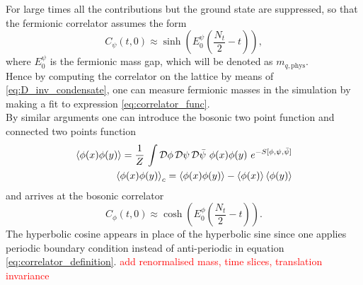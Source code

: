 For large times all the contributions but the ground state are suppressed, so that 
the fermionic correlator assumes the form 
\begin{equation}
    C_\psi(t,0) \approx \sinh \left(E_0^{\psi} \left(\frac{N_t}{2} - t\right)\right),
    \label{eq:correlator_func}
\end{equation}
where $E_0^{\psi}$ is the fermionic mass gap, which will be denoted as $m_{q,\text{phys}}$. \\
Hence by computing the correlator on the lattice by means of \eqref{eq:D_inv_condensate}, one can measure fermionic masses in the simulation by making a fit to expression \eqref{eq:correlator_func}. \\
By similar arguments one can introduce the bosonic two point function and connected two points function 
\begin{equation*}
    \begin{aligned}
        \left\langle \phi(x)\phi(y) \right\rangle = \frac{1}{Z} \, \int \mathcal{D}\phi \, \mathcal{D}\psi \, \mathcal{D}\bar\psi \ \phi(x) \phi(y) \ e^{-S[\phi, \psi, \bar\psi]} \\
        \left\langle \phi(x)\phi(y) \right\rangle_c = \left\langle \phi(x)\phi(y) \right\rangle - \left\langle \phi(x) \right\rangle\left\langle \phi(y) \right\rangle
    \end{aligned}
\end{equation*}
and arrives at the bosonic correlator 
\begin{equation}
    C_\phi(t,0) \approx \cosh \left(E_0^{\phi} \left(\frac{N_t}{2} - t\right)\right).
    \label{eq:correlator_func}
\end{equation}
The hyperbolic cosine appears in place of the hyperbolic sine since one applies periodic boundary condition instead of anti-periodic in equation \eqref{eq:correlator_definition}.
\textcolor{red}{add renormalised mass, time slices, translation invariance}